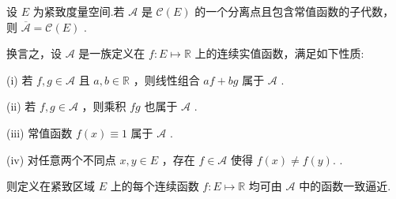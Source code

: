 \begin{theorem}\label{thm:stone-weierstrass}
设 $E$ 为紧致度量空间.若 $\mathcal{A}$ 是 $\mathcal{C}\left( E\right)$ 的一个分离点且包含常值函数的子代数，则 $\overline{\mathcal{A}} = \mathcal{C}\left( E\right)$ .

换言之，设 $\mathcal{A}$ 是一族定义在 $f : E \mapsto  \mathbb{R}$ 上的连续实值函数，满足如下性质:

(i) 若 $f,g \in  \mathcal{A}$ 且 $a,b \in  \mathbb{R}$ ，则线性组合 ${af} + {bg}$ 属于 $\mathcal{A}$ .

(ii) 若 $f,g \in  \mathcal{A}$ ，则乘积 ${fg}$ 也属于 $\mathcal{A}$ .

(iii) 常值函数 $f\left( x\right)  \equiv  1$ 属于 $\mathcal{A}$ .

(iv) 对任意两个不同点 $x,y \in  E$ ，存在 $f \in  \mathcal{A}$ 使得 $f\left( x\right)  \neq  f\left( y\right) .$ .

则定义在紧致区域 $E$ 上的每个连续函数 $f : E \mapsto  \mathbb{R}$ 均可由 $\mathcal{A}$ 中的函数一致逼近.
\end{theorem}

